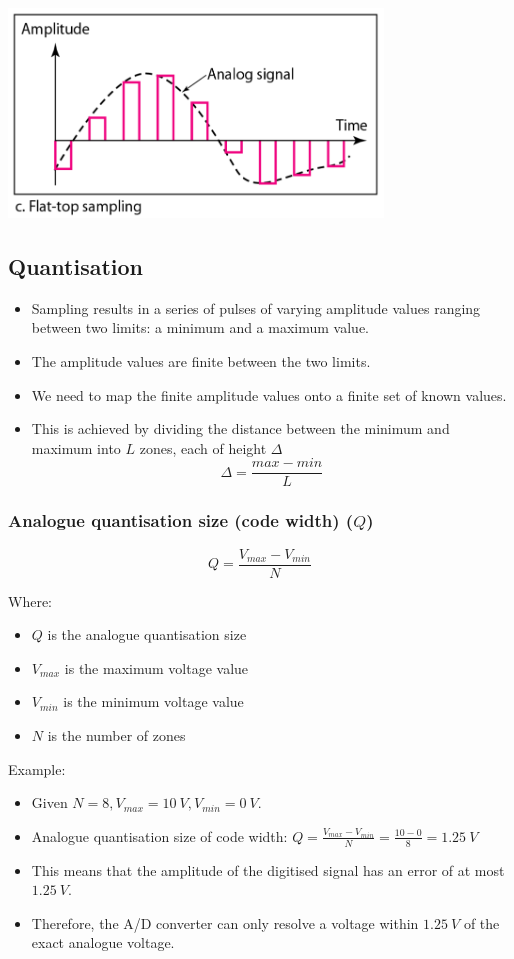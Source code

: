 \documentclass[11pt]{article}
\begin{document}
\begin{center}
\includegraphics[height=15em]{./images/flat-top-sampling.png}
\end{center}
\subsection{Quantisation}
\label{sec:org59db49f}
\begin{itemize}
\item Sampling results in a series of pulses of varying amplitude values ranging between two limits: a minimum and a maximum value.
\item The amplitude values are finite between the two limits.
\item We need to map the finite amplitude values onto a finite set of known values.
\item This is achieved by dividing the distance between the minimum and maximum into \(L\) zones, each of height \(\Delta\)
\[\Delta = \frac{max - min}{L}\]
\end{itemize}

 \newpage
\subsubsection{Analogue quantisation size (code width) (\(Q\))}
\label{sec:orgaa8422c}
\[Q = \frac{V_{max} - V_{min}}{N}\]

Where:
\begin{itemize}
\item \(Q\) is the analogue quantisation size
\item \(V_{max}\) is the maximum voltage value
\item \(V_{min}\) is the minimum voltage value
\item \(N\) is the number of zones
\end{itemize}

Example:
\begin{itemize}
\item Given \(N = 8, V_{max} = \qty{10}{V}, V_{min} = \qty{0}{V}\).
\item Analogue quantisation size of code width: \(Q = \frac{V_{max} - V_{min}}{N} = \frac{10 - 0}{8} = \qty{1.25}{V}\)
\item This means that the amplitude of the digitised signal has an error of at most \(\qty{1.25}{V}\).
\item Therefore, the A/D converter can only resolve a voltage within \(\qty{1.25}{V}\) of the exact analogue voltage.
\end{itemize}
\end{document}
